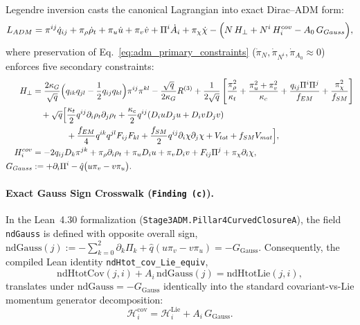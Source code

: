 Legendre inversion casts the canonical Lagrangian into exact Dirac--ADM form:
\begin{equation}
\mathcal{L}_{\mathrm{ADM}}
= \pi^{ij}\dot{q}_{ij} + \pi_\rho\dot{\rho}_t + \pi_u\dot{u} + \pi_v\dot{v} + \Pi^i\dot{A}_i + \pi_\chi\dot{\chi}
  - \Bigl(N\,\mathcal{H}_\perp + N^i\,\mathcal{H}_i^{\mathrm{cov}} - A_0\,G_{\mathrm{Gauss}}\Bigr),
\label{eq:L_ADM_canonical}
\end{equation}
where preservation of Eq.~\eqref{eq:adm_primary_constraints} ($\dot{\pi}_N, \dot{\pi}_{N^i}, \dot{\pi}_{A_0} \approx 0$) enforces five secondary constraints:
\begin{align}
\mathcal{H}_\perp &= \frac{2\kappa_G}{\sqrt{q}}\Bigl(q_{ik}q_{jl} - \frac{1}{2}q_{ij}q_{kl}\Bigr)\pi^{ij}\pi^{kl}
  - \frac{\sqrt{q}}{2\kappa_G}R^{(3)}
  + \frac{1}{2\sqrt{q}}\left[\frac{\pi_\rho^2}{\kappa_t} + \frac{\pi_u^2 + \pi_v^2}{\kappa_c} + \frac{q_{ij}\Pi^i\Pi^j}{f_{\mathrm{EM}}} + \frac{\pi_\chi^2}{f_{\mathrm{SM}}}\right]
  \nonumber\\
&\quad + \sqrt{q}\Bigl[
    \frac{\kappa_t}{2}q^{ij}\partial_i\rho_t\partial_j\rho_t
    + \frac{\kappa_c}{2}q^{ij}(D_i u D_j u + D_i v D_j v)
    \nonumber\\
&\qquad\qquad
    + \frac{f_{\mathrm{EM}}}{4}q^{ik}q^{jl}F_{ij}F_{kl}
    + \frac{f_{\mathrm{SM}}}{2}q^{ij}\partial_i\chi\partial_j\chi
    + V_{\mathrm{tot}} + f_{\mathrm{SM}}V_{\mathrm{mat}}
  \Bigr], \label{eq:H_perp_def}\\
\mathcal{H}_i^{\mathrm{cov}} &= -2 q_{ij} D_k\pi^{jk} + \pi_\rho\partial_i\rho_t + \pi_u D_i u + \pi_v D_i v + F_{ij}\Pi^j + \pi_\chi\partial_i\chi, \label{eq:Hi_cov_def}\\
G_{\mathrm{Gauss}} &:= +\partial_i\Pi^i - \hat{q}\bigl(u\pi_v - v\pi_u\bigr). \label{eq:G_Gauss_def}
\end{align}

\paragraph{Exact Gauss Sign Crosswalk (\texttt{Finding (c)}).}
In the Lean~4.30 formalization (\texttt{Stage3\allowbreak{}ADM.\allowbreak{}Pillar4\allowbreak{}Curved\allowbreak{}Closure\allowbreak{}A}), the field \texttt{ndGauss} is defined with opposite overall sign, $\mathrm{ndGauss}(j) := -\sum_{k=0}^2 \partial_k\Pi_k + \hat{q}(u\pi_v - v\pi_u) = -G_{\mathrm{Gauss}}$. Consequently, the compiled Lean identity \texttt{nd\allowbreak{}Htot\_\allowbreak{}cov\_\allowbreak{}Lie\_\allowbreak{}equiv},
\[
\mathrm{ndHtotCov}(j, i) + A_i\,\mathrm{ndGauss}(j) = \mathrm{ndHtotLie}(j, i),
\]
translates under $\mathrm{ndGauss} = -G_{\mathrm{Gauss}}$ identically into the standard covariant-vs-Lie momentum generator decomposition:
\begin{equation}
\mathcal{H}_i^{\mathrm{cov}} = \mathcal{H}_i^{\mathrm{Lie}} + A_i\,G_{\mathrm{Gauss}}.
\label{eq:Hi_cov_Lie_identity}
\end{equation}


